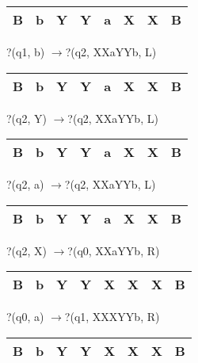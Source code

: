 \documentclass{article} %
\begin{document}
\noindent 

\noindent 

\noindent 

\noindent 

\begin{tabular}{|p{0.2in}|p{0.2in}|p{0.2in}|p{0.2in}|p{0.2in}|p{0.2in}|p{0.2in}|p{0.2in}|} \hline 
B & b & Y & Y & a & X & X & B \\ \hline 
\end{tabular}

?(q1, b) $\to $?(q2, XXaYYb, L)

\noindent 

\begin{tabular}{|p{0.2in}|p{0.2in}|p{0.2in}|p{0.2in}|p{0.2in}|p{0.2in}|p{0.2in}|p{0.2in}|} \hline 
B & b & Y & Y & a & X & X & B \\ \hline 
\end{tabular}

?(q2, Y) $\to $?(q2, XXaYYb, L)

\noindent 

\begin{tabular}{|p{0.2in}|p{0.2in}|p{0.2in}|p{0.2in}|p{0.2in}|p{0.2in}|p{0.2in}|p{0.2in}|} \hline 
B & b & Y & Y & a & X & X & B \\ \hline 
\end{tabular}

?(q2, a) $\to $?(q2, XXaYYb, L)

\noindent 

\begin{tabular}{|p{0.2in}|p{0.2in}|p{0.2in}|p{0.2in}|p{0.2in}|p{0.2in}|p{0.2in}|p{0.2in}|} \hline 
B & b & Y & Y & a & X & X & B \\ \hline 
\end{tabular}

?(q2, X) $\to $?(q0, XXaYYb, R)

\noindent 

\begin{tabular}{|p{0.2in}|p{0.2in}|p{0.2in}|p{0.2in}|p{0.2in}|p{0.2in}|p{0.2in}|p{0.2in}|} \hline 
B & b & Y & Y & X & X & X & B \\ \hline 
\end{tabular}

?(q0, a) $\to $?(q1, XXXYYb, R)

\noindent 

\begin{tabular}{|p{0.2in}|p{0.2in}|p{0.2in}|p{0.2in}|p{0.2in}|p{0.2in}|p{0.2in}|p{0.2in}|} \hline 
B & b & Y & Y & X & X & X & B \\ \hline 
\end{tabular}
\end{document}

